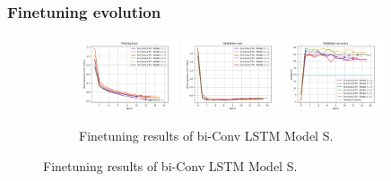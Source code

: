 \documentclass{beamer}
\begin{document}
\begin{frame}
    \frametitle{Finetuning evolution}
    \begin{figure}[htbp]
        \centering    
        \begin{subfigure}[b]{\textwidth}
            \centering
            \includegraphics[width=0.32\textwidth]{../report/entities/finetuned/unipose/train_losses.png}
            \includegraphics[width=0.32\textwidth]{../report/entities/finetuned/unipose/val_losses.png}
            \includegraphics[width=0.32\textwidth]{../report/entities/finetuned/unipose/val_accs.png}
            \caption{Finetuning results of bi-Conv LSTM Model S.}
        \end{subfigure}
        \hfill
    

\end{figure}
\end{frame}
\end{document}
